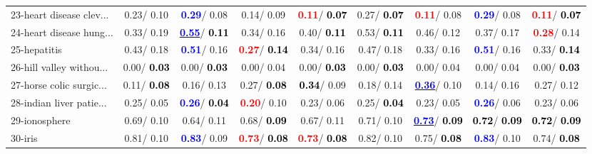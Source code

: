 \begin{table}[h]
\begin{center}
\begin{tabular}{lc|c|c|c|c|c|c|c}
23-heart disease clev... &   0.23/  0.10 & \textcolor{blue}{\textbf{  0.29}}/  0.08 &   0.14/  0.09 & \textcolor{red}{\textbf{  0.11}}/\textcolor{black}{\textbf{  0.07}} &   0.27/\textcolor{black}{\textbf{  0.07}} & \textcolor{red}{\textbf{  0.11}}/  0.08 & \textcolor{blue}{\textbf{  0.29}}/  0.08 & \textcolor{red}{\textbf{  0.11}}/\textcolor{black}{\textbf{  0.07}} \\
24-heart disease hung... &   0.33/  0.19 & \underline{\textcolor{blue}{\textbf{  0.55}}}/\textcolor{black}{\textbf{  0.11}} &   0.34/  0.16 &   0.40/\textcolor{black}{\textbf{  0.11}} &   0.53/\textcolor{black}{\textbf{  0.11}} &   0.46/  0.12 &   0.37/  0.17 & \textcolor{red}{\textbf{  0.28}}/  0.14 \\
25-hepatitis &   0.43/  0.18 & \textcolor{blue}{\textbf{  0.51}}/  0.16 & \textcolor{red}{\textbf{  0.27}}/\textcolor{black}{\textbf{  0.14}} &   0.34/  0.16 &   0.47/  0.18 &   0.33/  0.16 & \textcolor{blue}{\textbf{  0.51}}/  0.16 &   0.33/\textcolor{black}{\textbf{  0.14}} \\
26-hill valley withou... &   0.00/\textcolor{black}{\textbf{  0.03}} &   0.00/\textcolor{black}{\textbf{  0.03}} &   0.00/  0.04 &   0.00/\textcolor{black}{\textbf{  0.03}} &   0.00/\textcolor{black}{\textbf{  0.03}} &   0.00/  0.04 &   0.00/  0.04 &   0.00/\textcolor{black}{\textbf{  0.03}} \\
27-horse colic surgic... &   0.11/\textcolor{black}{\textbf{  0.08}} &   0.16/  0.13 &   0.27/\textcolor{black}{\textbf{  0.08}} & \textcolor{black}{\textbf{  0.34}}/  0.09 &   0.18/  0.14 & \underline{\textcolor{blue}{\textbf{  0.36}}}/  0.10 &   0.14/  0.16 &   0.27/  0.12 \\
28-indian liver patie... &   0.25/  0.05 & \textcolor{blue}{\textbf{  0.26}}/\textcolor{black}{\textbf{  0.04}} & \textcolor{red}{\textbf{  0.20}}/  0.10 &   0.23/  0.06 &   0.25/\textcolor{black}{\textbf{  0.04}} &   0.23/  0.05 & \textcolor{blue}{\textbf{  0.26}}/  0.06 &   0.23/  0.06 \\ \hline
29-ionosphere &   0.69/  0.10 &   0.64/  0.11 &   0.68/\textcolor{black}{\textbf{  0.09}} &   0.67/  0.11 &   0.71/  0.10 & \underline{\textcolor{blue}{\textbf{  0.73}}}/\textcolor{black}{\textbf{  0.09}} & \textcolor{black}{\textbf{  0.72}}/\textcolor{black}{\textbf{  0.09}} & \textcolor{black}{\textbf{  0.72}}/\textcolor{black}{\textbf{  0.09}} \\
30-iris &   0.81/  0.10 & \textcolor{blue}{\textbf{  0.83}}/  0.09 & \textcolor{red}{\textbf{  0.73}}/\textcolor{black}{\textbf{  0.08}} & \textcolor{red}{\textbf{  0.73}}/\textcolor{black}{\textbf{  0.08}} &   0.82/  0.10 &   0.75/\textcolor{black}{\textbf{  0.08}} & \textcolor{blue}{\textbf{  0.83}}/  0.10 &   0.74/\textcolor{black}{\textbf{  0.08}} \\

\end{tabular}
\end{center}
\end{table}
